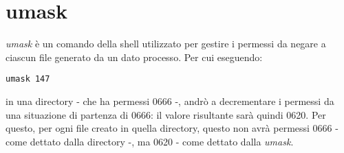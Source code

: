 \section{umask}
\textit{umask} è un comando della shell utilizzato per gestire i permessi da negare a ciascun file generato da un dato processo. Per cui eseguendo:
\begin{lstlisting}
umask 147
\end{lstlisting}
in una directory - che ha permessi 0666 -, andrò a decrementare i permessi da una situazione di partenza di 0666: il valore risultante sarà quindi 0620. Per questo, per ogni file creato in quella directory, questo non avrà permessi 0666 - come dettato dalla directory -, ma 0620 - come dettato dalla \textit{umask}.